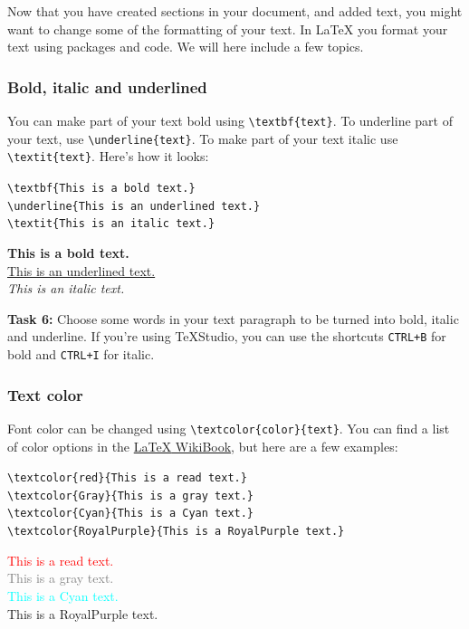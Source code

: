 \documentclass[12pts]{article}
\begin{document}
	Now that you have created sections in your document, and added text, you might want to change some of the formatting of your text. In {\LaTeX} you format your text using packages and code. We will here include a few topics.
	
	\subsubsection{Bold, italic and underlined}
	
	You can make part of your text bold using \verb|\textbf{text}|. To 	underline part of your text, use \verb|\underline{text}|. To make part of your text italic use \verb|\textit{text}|. Here's how it looks:
	
	\begin{center}
		\begin{multicols}{2}
			\verb|\textbf{This is a bold text.}| \\
			\verb|\underline{This is an underlined text.}| \\
			\verb|\textit{This is an italic text.}| \\
			
			\columnbreak
			
			\textbf{This is a bold text.} \\
			\underline{This is an underlined text.} \\
			\textit{This is an italic text.}
		\end{multicols}
	\end{center}
	
	\textcolor{BurntOrange}{\textbf{Task 6:}} Choose some words in your text paragraph to be turned into bold, italic and underline. If you're using TeXStudio, you can use the shortcuts \texttt{CTRL+B} for bold and \texttt{CTRL+I} for italic.
	
	\subsubsection{Text color}
	Font color can be changed using \verb|\textcolor{color}{text}|. You can find a list of color options in the \href{https://en.wikibooks.org/wiki/LaTeX/Colors}{{\LaTeX} WikiBook}, but here are a few examples:
	
	\clearpage
	\begin{center}
		\begin{multicols}{2}
			\verb|\textcolor{red}{This is a read text.}| \\
			\verb|\textcolor{Gray}{This is a gray text.}| \\
			\verb|\textcolor{Cyan}{This is a Cyan text.}| \\
			\verb|\textcolor{RoyalPurple}{This is a RoyalPurple text.}|
			
			\columnbreak
			
			\textcolor{red}{This is a read text.} \\
			\textcolor{Gray}{This is a gray text.} \\
			\textcolor{Cyan}{This is a Cyan text.} \\
			\textcolor{RoyalPurple}{This is a RoyalPurple text.}
		\end{multicols}
	\end{center}
	
\end{document}
